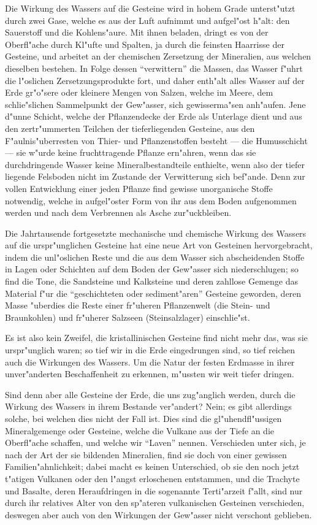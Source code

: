 \documentclass[a4paper, 11pt, oneside]{article}
\begin{document}
Die Wirkung des Wassers auf die Gesteine wird in hohem Grade unterst"utzt durch zwei Gase, welche es aus der Luft aufnimmt und aufgel"ost h"alt: den Sauerstoff und die Kohlens"aure. Mit ihnen beladen, dringt es von der Oberfl"ache durch Kl"ufte und Spalten, ja durch die feinsten Haarrisse der Gesteine, und arbeitet an der chemischen Zersetzung der Mineralien, aus welchen dieselben bestehen. In Folge dessen "`verwittern"' die Massen, das Wasser f"uhrt die l"oslichen Zersetzungsprodukte fort, und daher enth"alt alles Wasser auf der Erde gr"o"sere oder kleinere Mengen von Salzen, welche im Meere, dem schlie"slichen Sammelpunkt der Gew"asser, sich gewisserma"sen anh"aufen. Jene d"unne Schicht, welche der Pflanzendecke der Erde als Unterlage dient und aus den zertr"ummerten Teilchen der tieferliegenden Gesteine, aus den F"aulnis"uberresten von Thier- und Pflanzenstoffen besteht --- die Humusschicht --- sie w"urde keine fruchttragende Pflanze ern"ahren, wenn das sie durchdringende Wasser keine Mineralbestandteile enthielte, wenn also der tiefer liegende Felsboden nicht im Zustande der Verwitterung sich bef"ande. Denn zur vollen Entwicklung einer jeden Pflanze find gewisse unorganische Stoffe notwendig, welche in aufgel"oster Form von ihr aus dem Boden aufgenommen werden und nach dem Verbrennen als Asche zur"uckbleiben.

Die Jahrtausende fortgesetzte mechanische und chemische Wirkung des Wassers auf die urspr"unglichen Gesteine hat eine neue Art von Gesteinen hervorgebracht, indem die unl"oslichen Reste und die aus dem Wasser sich abscheidenden Stoffe in Lagen oder Schichten auf dem Boden der Gew"asser sich niederschlugen; so find die Tone, die Sandsteine und Kalksteine und deren zahllose Gemenge das Material f"ur die "`geschichteten oder sediment"aren"' Gesteine geworden, deren Masse "uberdies die Reste einer fr"uheren Pflanzenwelt (die Stein- und Braunkohlen) und fr"uherer Salzseen (Steinsalzlager) einschlie"st.

Es ist also kein Zweifel, die kristallinischen Gesteine find nicht mehr das, was sie urspr"unglich waren; so tief wir in die Erde eingedrungen sind, so tief reichen auch die Wirkungen des Wassers. Um die Natur der festen Erdmasse in ihrer unver"anderten Beschaffenheit zu erkennen, m"ussten wir weit tiefer dringen.

Sind denn aber alle Gesteine der Erde, die uns zug"anglich werden, durch die Wirkung des Wassers in ihrem Bestande ver"andert? Nein; es gibt allerdings solche, bei welchen dies nicht der Fall ist. Dies sind die gl"uhendfl"ussigen Mineralgemenge oder Gesteine, welche die Vulkane aus der Tiefe an die Oberfl"ache schaffen, und welche wir "`Laven"' nennen. Verschieden unter sich, je nach der Art der sie bildenden Mineralien, find sie doch von einer gewissen Familien"ahnlichkeit; dabei macht es keinen Unterschied, ob sie den noch jetzt t"atigen Vulkanen oder den l"angst erloschenen entstammen, und die Trachyte und Basalte, deren Heraufdringen in die sogenannte Terti"arzeit f"allt, sind nur durch ihr relatives Alter von den sp"ateren vulkanischen Gesteinen verschieden, deswegen aber auch von den Wirkungen der Gew"asser nicht verschont geblieben.
\end{document}
